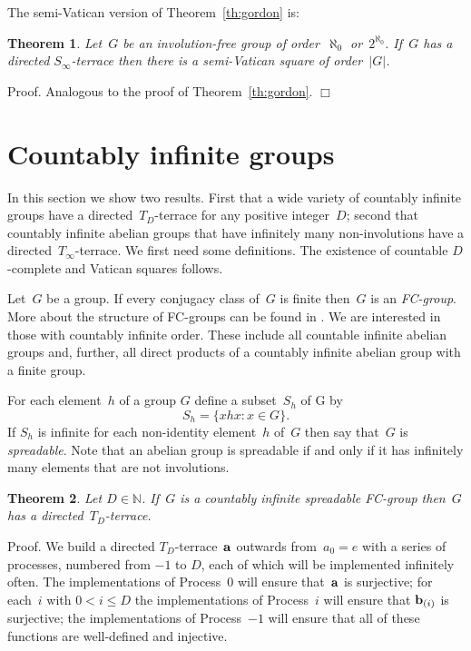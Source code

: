 \documentclass[12pt,a4paper]{article}
\newtheorem{thm}{Theorem}
\newcommand{\N}{\mathbb{N}}
\newcommand{\qed}{\unskip\protect\nolinebreak\mbox{\quad$\Box$}\vspace{3mm}}
\begin{document}
The semi-Vatican version of Theorem~\ref{th:gordon} is:

\begin{thm}\label{th:semigordon}
Let~$G$ be an involution-free group of order~$\aleph_0$ or~$2^{\aleph_0}$.  If~$G$ has a directed $S_{\infty}$-terrace then there is a semi-Vatican square of order~$|G|$.
\end{thm}

\noindent
Proof.  Analogous to the proof of Theorem~\ref{th:gordon}.
\qed





\section{Countably infinite groups}\label{sec:cigps}


In this section we show two results.  First that a wide variety of countably infinite groups have a directed~$T_{D}$-terrace for any positive integer~$D$; second that countably infinite abelian groups that have infinitely many non-involutions have a directed~$T_{\infty}$-terrace.  We first need some definitions.  The existence of countable $D$-complete and Vatican squares follows.

Let~$G$ be a group.  If every conjugacy class of~$G$ is finite then~$G$ is an {\em FC-group}.  More about the structure of FC-groups can be found in \cite[Chapter~15]{Scott64}.   We are interested in those with countably infinite order.  These include all countable infinite abelian groups and, further, all direct products of a countably infinite abelian group with a finite group.

For each element~$h$ of a group $G$ define a subset~$S_h$ of G by
$$S_h = \{ xhx :  x \in G \}.$$
If $S_h$ is infinite for each non-identity element~$h$ of~$G$ then say that~$G$ is {\em spreadable}.  Note that an abelian group is spreadable if and only if it has infinitely many elements that are not involutions.


\begin{thm}\label{th:3a}
Let $D \in \N$.  If~$G$ is a countably infinite spreadable FC-group then~$G$ has a directed~$T_{D}$-terrace.
\end{thm}


\noindent
Proof.
We build  a directed $T_{D}$-terrace~${\bf a}$ outwards from~$a_0 = e$ with a series of processes, numbered from $-1$ to $D$, each of which will be implemented infinitely often.  The implementations of Process~0 will ensure that~${\bf a}$ is surjective; for each~$i$ with  $0 < i \leq D$ the implementations of Process~$i$ will ensure that ${\bf b}_{(i)}$ is surjective; the implementations of Process~$-1$ will ensure that all of these functions are well-defined and injective.
\end{document}
